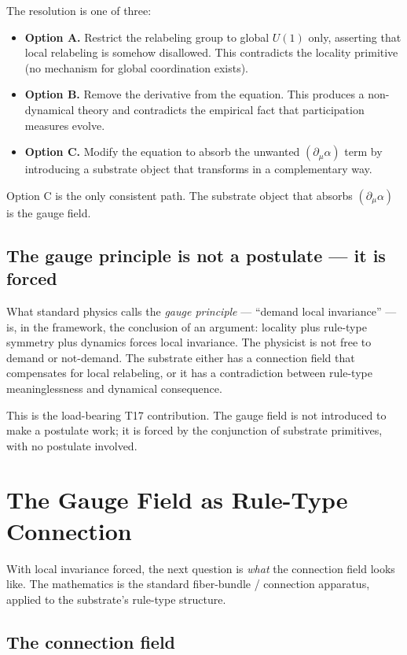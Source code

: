 \documentclass[11pt,a4paper]{article}
\begin{document}
The resolution is one of three:

\begin{itemize}[noitemsep]
  \item \textbf{Option A.} Restrict the relabeling group to global $U(1)$ only, asserting that local relabeling is somehow disallowed. This contradicts the locality primitive (no mechanism for global coordination exists).
  \item \textbf{Option B.} Remove the derivative from the equation. This produces a non-dynamical theory and contradicts the empirical fact that participation measures evolve.
  \item \textbf{Option C.} Modify the equation to absorb the unwanted $(\partial_\mu \alpha)$ term by introducing a substrate object that transforms in a complementary way.
\end{itemize}

Option C is the only consistent path. The substrate object that absorbs $(\partial_\mu \alpha)$ is the gauge field.

\subsection{The gauge principle is not a postulate --- it is forced}

What standard physics calls the \emph{gauge principle} --- ``demand local invariance'' --- is, in the framework, the conclusion of an argument: locality plus rule-type symmetry plus dynamics forces local invariance. The physicist is not free to demand or not-demand. The substrate either has a connection field that compensates for local relabeling, or it has a contradiction between rule-type meaninglessness and dynamical consequence.

This is the load-bearing T17 contribution. The gauge field is not introduced to make a postulate work; it is forced by the conjunction of substrate primitives, with no postulate involved.

\section{The Gauge Field as Rule-Type Connection}

With local invariance forced, the next question is \emph{what} the connection field looks like. The mathematics is the standard fiber-bundle / connection apparatus, applied to the substrate's rule-type structure.

\subsection{The connection field}
\end{document}
